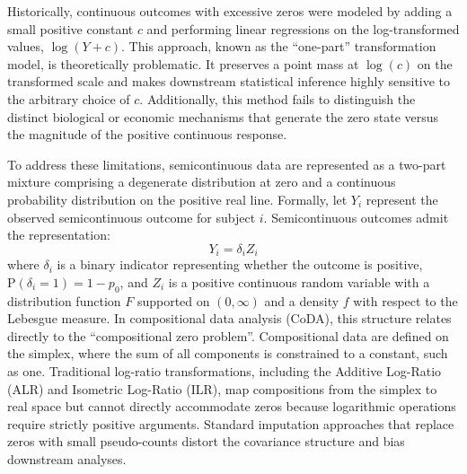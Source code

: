 \documentclass[11pt, a4paper]{article}
\begin{document}
Historically, continuous outcomes with excessive zeros were modeled by adding a small positive constant $c$ and performing linear regressions on the log-transformed values, $\log(Y + c)$.\cite{duan1983} This approach, known as the ``one-part'' transformation model, is theoretically problematic.\cite{duan1983} It preserves a point mass at $\log(c)$ on the transformed scale and makes downstream statistical inference highly sensitive to the arbitrary choice of $c$.\cite{duan1983} Additionally, this method fails to distinguish the distinct biological or economic mechanisms that generate the zero state versus the magnitude of the positive continuous response.\cite{tooze2002, duan1983}

To address these limitations, semicontinuous data are represented as a two-part mixture comprising a degenerate distribution at zero and a continuous probability distribution on the positive real line.\cite{lachenbruch2002, min2002, kokonendji2021} Formally, let $Y_i$ represent the observed semicontinuous outcome for subject $i$.\cite{kokonendji2021, muller2004} Semicontinuous outcomes admit the representation:
\begin{equation}
Y_i = \delta_i Z_i
\end{equation}
where $\delta_i$ is a binary indicator representing whether the outcome is positive, $\text{P}(\delta_i = 1) = 1 - p_0$, and $Z_i$ is a positive continuous random variable with a distribution function $F$ supported on $(0, \infty)$ and a density $f$ with respect to the Lebesgue measure.\cite{albert2005, kokonendji2021, muller2004} In compositional data analysis (CoDA), this structure relates directly to the ``compositional zero problem''.\cite{aitchison1982, aitchison1986} Compositional data are defined on the simplex, where the sum of all components is constrained to a constant, such as one.\cite{aitchison1982, aitchison1986} Traditional log-ratio transformations, including the Additive Log-Ratio (ALR) and Isometric Log-Ratio (ILR), map compositions from the simplex to real space but cannot directly accommodate zeros because logarithmic operations require strictly positive arguments.\cite{aitchison1986} Standard imputation approaches that replace zeros with small pseudo-counts distort the covariance structure and bias downstream analyses.\cite{aitchison1982, aitchison1986, egozcue2003}
\end{document}
